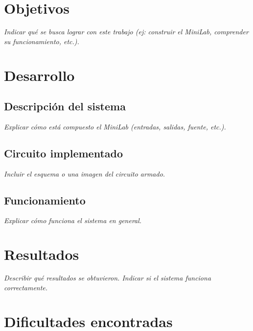\documentclass[12pt,a4paper]{article}
\begin{document}
\vspace{0.5cm}

\section{Objetivos}

\textit{Indicar qué se busca lograr con este trabajo (ej: construir el MiniLab, comprender su funcionamiento, etc.).}

\section{Desarrollo}

\subsection{Descripción del sistema}

\textit{Explicar cómo está compuesto el MiniLab (entradas, salidas, fuente, etc.).}

\subsection{Circuito implementado}

\textit{Incluir el esquema o una imagen del circuito armado.}


\subsection{Funcionamiento}

\textit{Explicar cómo funciona el sistema en general.}

\section{Resultados}

\textit{Describir qué resultados se obtuvieron. Indicar si el sistema funciona correctamente.}

\section{Dificultades encontradas}
\end{document}
